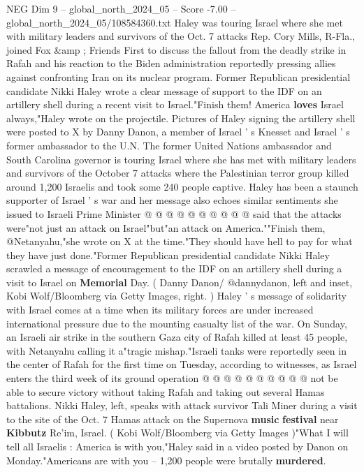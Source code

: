 \begin{textsample}{NEG Dim 9 – global\_north\_2024\_05 – Score -7.00 – global\_north\_2024\_05/108584360.txt}  \label{ex:f9_neg_236}
Haley was touring Israel where she met with military leaders and survivors of the Oct. 7 attacks Rep.
Cory Mills, R-Fla., joined Fox \&amp ; Friends First to discuss the fallout from the deadly strike in Rafah and his reaction to the Biden administration reportedly pressing allies against confronting Iran on its nuclear program.
Former Republican presidential candidate Nikki Haley wrote a clear message of support to the IDF on an artillery shell during a recent visit to Israel."Finish them!
America \textbf{loves} Israel always,"Haley wrote on the projectile.
Pictures of Haley signing the artillery shell were posted to X by Danny Danon, a member of Israel ' s Knesset and Israel ' s former ambassador to the U.N.
The former United Nations ambassador and South Carolina governor is touring Israel where she has met with military leaders and survivors of the October 7 attacks where the Palestinian terror group killed around 1,200 Israelis and took some 240 people captive.
Haley has been a staunch supporter of Israel ' s war and her message also echoes similar sentiments she issued to Israeli Prime Minister @ @ @ @ @ @ @ @ @ @ said that the attacks were"not just an attack on Israel"but"an attack on America.""Finish them, @Netanyahu,"she wrote on X at the time."They should have hell to pay for what they have just done."Former Republican presidential candidate Nikki Haley scrawled a message of encouragement to the IDF on an artillery shell during a visit to Israel on \textbf{Memorial} Day. ( Danny Danon/ @dannydanon, left and inset, Kobi Wolf/Bloomberg via Getty Images, right. ) Haley ' s message of solidarity with Israel comes at a time when its military forces are under increased international pressure due to the mounting casualty list of the war.
On Sunday, an Israeli air strike in the southern Gaza city of Rafah killed at least 45 people, with Netanyahu calling it a"tragic mishap."Israeli tanks were reportedly seen in the center of Rafah for the first time on Tuesday, according to witnesses, as Israel enters the third week of its ground operation @ @ @ @ @ @ @ @ @ @ not be able to secure victory without taking Rafah and taking out several Hamas battalions.
Nikki Haley, left, speaks with attack survivor Tali Miner during a visit to the site of the Oct. 7 Hamas attack on the Supernova \textbf{music} \textbf{festival} near \textbf{Kibbutz} Re'im, Israel. ( Kobi Wolf/Bloomberg via Getty Images )"What I will tell all Israelis : America is with you,"Haley said in a video posted by Danon on Monday."Americans are with you -- 1,200 people were brutally \textbf{murdered}.

\end{textsample}
